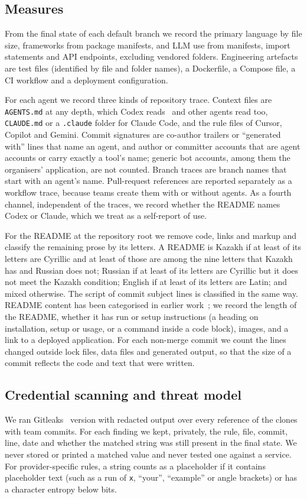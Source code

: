\documentclass{article}
\begin{document}
\subsection{Measures}
From the final state of each default branch we record the primary language by file size, frameworks from package manifests, and LLM use from manifests, import statements and API endpoints, excluding vendored folders. Engineering artefacts are test files (identified by file and folder names), a Dockerfile, a Compose file, a CI workflow and a deployment configuration.

For each agent we record three kinds of repository trace. Context files are \texttt{AGENTS.md} at any depth, which Codex reads~\cite{openai2026agentsmd} and other agents read too, \texttt{CLAUDE.md} or a \texttt{.claude} folder for Claude Code, and the rule files of Cursor, Copilot and Gemini. Commit signatures are co-author trailers or ``generated with'' lines that name an agent, and author or committer accounts that are agent accounts or carry exactly a tool's name; generic bot accounts, among them the organisers' application, are not counted. Branch traces are branch names that start with an agent's name. Pull-request references are reported separately as a workflow trace, because teams create them with or without agents. As a fourth channel, independent of the traces, we record whether the README names Codex or Claude, which we treat as a self-report of use.

For the README at the repository root we remove code, links and markup and classify the remaining prose by its letters. A README is Kazakh if at least \thrcyr{} of its letters are Cyrillic and at least \thrkaz{} of those are among the nine letters that Kazakh has and Russian does not; Russian if at least \thrcyr{} of its letters are Cyrillic but it does not meet the Kazakh condition; English if at least \thrlat{} of its letters are Latin; and mixed otherwise. The script of commit subject lines is classified in the same way. README content has been categorised in earlier work~\cite{prana2019readme}; we record the length of the README, whether it has run or setup instructions (a heading on installation, setup or usage, or a command inside a code block), images, and a link to a deployed application. For each non-merge commit we count the lines changed outside lock files, data files and generated output, so that the size of a commit reflects the code and text that were written.

\subsection{Credential scanning and threat model}
We ran Gitleaks~\cite{gitleaks2026} version \gitleaksversion{} with redacted output over every reference of the \NRqFourScannedRepos{} clones with team commits. For each finding we kept, privately, the rule, file, commit, line, date and whether the matched string was still present in the final state. We never stored or printed a matched value and never tested one against a service. For provider-specific rules, a string counts as a placeholder if it contains placeholder text (such as a run of \texttt{x}, ``your'', ``example'' or angle brackets) or has a character entropy below \entropythr{} bits.
\end{document}
